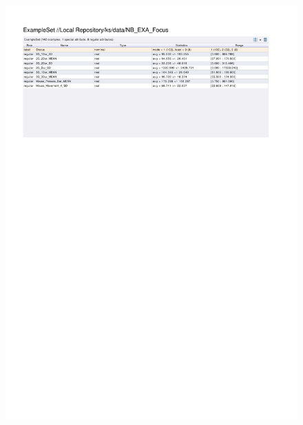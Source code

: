 \begin{figure}[htp]
  \centerline{\includegraphics[trim=0 650 0 60,clip,width=16.09cm]{results/NB_EXA_Focus.pdf}} \caption{
} \label{NB_K_Focus}
\end{figure}

